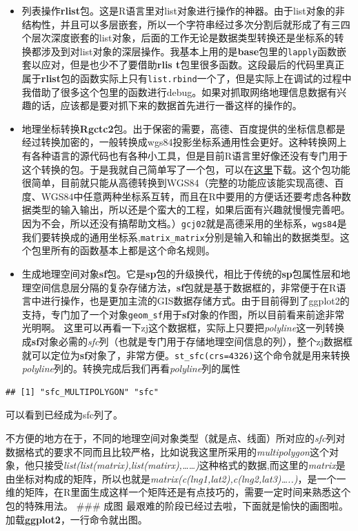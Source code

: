\documentclass[]{article}
\begin{document}
\begin{itemize}
\item
  列表操作\textbf{rlist}包。这是R语言里对list对象进行操作的神器。由于list对象的非结构性，并且可以多层嵌套，所以一个字符串经过多次分割后就形成了有三四个层次深度嵌套的list对象，后面的工作无论是数据类型转换还是坐标系的转换都涉及到对list对象的深层操作。我基本上用的是\textbf{base}包里的\texttt{lapply}函数嵌套以应对，但是也少不了要借助\textbf{rlis
  t}包里很多函数。这段最后的代码里真正属于\textbf{rlist}包的函数实际上只有\texttt{list.rbind}一个了，但是实际上在调试的过程中我借助了很多这个包里的函数进行debug。如果对抓取网络地理信息数据有兴趣的话，应该都是要对抓下来的数据首先进行一番这样的操作的。
\item
  地理坐标转换\textbf{Rgctc2}包。出于保密的需要，高德、百度提供的坐标信息都是经过转换加密的，一般转换成wgs84投影坐标系通用性会更好。这种转换网上有各种语言的源代码也有各种小工具，但是目前R语言里好像还没有专门用于这个转换的包。于是我就自己简单写了一个包，可以在\href{https://github.com/zhouqiangnju/R_coordination_transformation}{这里}下载。这个包功能很简单，目前就只能从高德转换到WGS84（完整的功能应该能实现高德、百度、WGS84中任意两种坐标系互转，而且在R中要用的方便话还要考虑各种数据类型的输入输出，所以还是个蛮大的工程，如果后面有兴趣就慢慢完善吧。因为不会，所以还没有搞帮助文档。）\texttt{gcj02}就是高德采用的坐标系，\texttt{wgs84}是我们要转换成的通用坐标系,\texttt{matrix\_matrix}分别是输入和输出的数据类型。这个包里所有的函数基本上都是这个命名规则。
\item
  生成地理空间对象\textbf{sf}包。它是\textbf{sp}包的升级换代，相比于传统的\textbf{sp}包属性层和地理空间信息层分隔的复杂存储方法，\textbf{sf}包就是基于数据框的，非常便于在R语言中进行操作，也是更加主流的GIS数据存储方式。由于目前得到了ggplot2的支持，专门加了一个对象\texttt{geom\_sf}用于\textbf{sf}对象的作图，所以目前看来前途非常光明啊。
  这里可以再看一下zj这个数据框，实际上只要把\emph{polyline}这一列转换成\textbf{sf}对象必需的\emph{sfc}列（也就是专门用于存储地理空间信息的列），整个zj数据框就可以定位为\textbf{sf}对象了，非常方便。\texttt{st\_sfc(crs=4326)}这个命令就是用来转换\emph{polyline}列的。转换完成后我们再看\emph{polyline}列的属性
\end{itemize}

\begin{verbatim}
## [1] "sfc_MULTIPOLYGON" "sfc"
\end{verbatim}

可以看到已经成为sfc列了。

不方便的地方在于，不同的地理空间对象类型（就是点、线面）所对应的\emph{sfc}列对数据格式的要求不同而且比较严格，比如说我这里所采用的\emph{multipolygon}这个对象，他只接受\emph{list(list(matrix),list(matirx),\ldots{}\ldots{})}这种格式的数据,而这里的\emph{matrix}是由坐标对构成的矩阵，所以也就是\emph{matrix(c(lng1,lat2),c(lng2,lat3)\ldots{}..)}，是一个一维的矩阵，在R里面生成这样一个矩阵还是有点技巧的，需要一定时间来熟悉这个包的特殊用法。
\#\#\# 成图
最艰难的阶段已经过去啦，下面就是愉快的画图啦。加载\textbf{ggplot2}，一行命令就出图。
\end{document}
